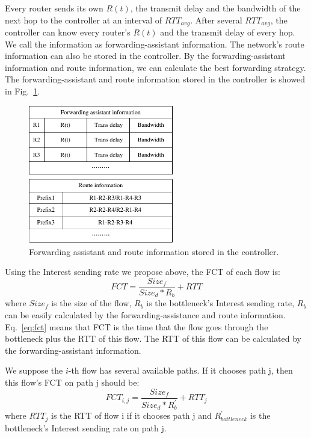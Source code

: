 Every router sends its own $R(t)$, the transmit delay and the bandwidth of the next hop to the controller at an interval of $RTT_{avg}$. After several $RTT_{avg}$, the controller can know every router's $R(t)$ and the transmit delay of every hop. We call the information as forwarding-assistant information. The network's route information can also be stored in the controller. By the forwarding-assistant information and route information, we can calculate the best forwarding strategy. The forwarding-assistant and route information stored in the controller is showed in Fig.~\ref{fig-assistant-information}.

\begin{figure}[t]
	\centering
	\includegraphics[width=2.5in]{forwarding-assistant-information.pdf}
	\caption{Forwarding assistant and route information stored in the controller.}
	\label{fig-assistant-information}
\end{figure}

Using the Interest sending rate we propose above, the FCT of each flow is:
\begin{equation}
	\label{eq:fct}
	FCT=\frac{Size_{f}}{Size_{d}\ast{R_{b}}}+RTT
\end{equation}
where $Size_{f}$ is the size of the flow, $R_{b}$ is the bottleneck's Interest sending rate, $R_{b}$ can be easily calculated by the forwarding-assistance and route information. Eq.~\ref{eq:fct} means that FCT is the time that the flow goes through the bottleneck plus the RTT of this flow. The RTT of this flow can be calculated by the forwarding-assistant information.

We suppose the $i$-th flow has several available paths. If it chooses path j, then this flow's FCT on path j should be:
\begin{equation}
	\label{eq:fctij}
	FCT_{i,j}=\frac{Size_{f}}{Size_{d}\ast{R^{'}_{b}}}+RTT_j
\end{equation}
where $RTT_j$ is the RTT of flow i if it chooses path j and $R^{'}_{bottleneck}$ is the bottleneck's Interest sending rate on path j.

